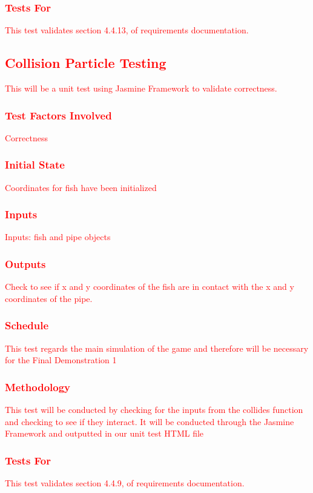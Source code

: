 \documentclass[11pt, oneside]{article}   	%
\begin{document}
\subsubsection{\textcolor{red}{Tests For}}
\textcolor{red}{This test validates section 4.4.13, of requirements documentation.}





\subsection{\textcolor{red}{Collision Particle Testing}}
\textcolor{red}{This will be a unit test using Jasmine Framework to validate correctness.}
\subsubsection{\textcolor{red}{Test Factors Involved}}
\textcolor{red}{Correctness}
\subsubsection{\textcolor{red}{Initial State}}
\textcolor{red}{Coordinates for fish have been initialized}
\subsubsection{\textcolor{red}{Inputs}}
\textcolor{red}{Inputs: fish and pipe objects}
\subsubsection{\textcolor{red}{Outputs}}
\textcolor{red}{Check to see if x and y coordinates of the fish are in contact with the x and y coordinates of the pipe.}
\subsubsection{\textcolor{red}{Schedule}}
\textcolor{red}{This test regards the main simulation of the game and therefore will be necessary for the Final Demonstration 1}
\subsubsection{\textcolor{red}{Methodology}}
\textcolor{red}{This test will be conducted by checking for the inputs from the collides function and checking to see if they interact. It will be conducted through the Jasmine Framework and outputted in our unit test HTML file}
\subsubsection{\textcolor{red}{Tests For}}
\textcolor{red}{This test validates section 4.4.9, of requirements documentation.}
\end{document}
